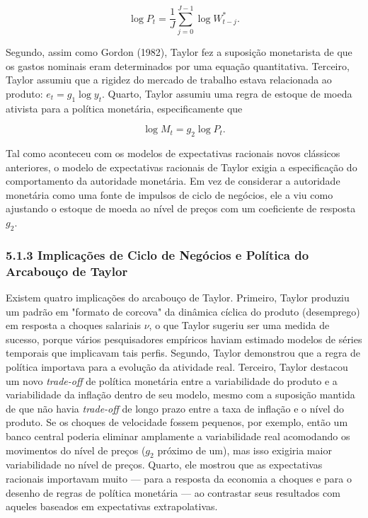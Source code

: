 \documentclass[12pt]{article}
\begin{document}
\begin{equation}
\log P_t = \frac{1}{J} \sum_{j=0}^{J-1} \log W_{t-j}^*. \tag{5.3}
\end{equation}

Segundo, assim como Gordon (1982), Taylor fez a suposição monetarista de que os gastos nominais eram determinados por uma equação quantitativa. Terceiro, Taylor assumiu que a rigidez do mercado de trabalho estava relacionada ao produto: $e_t = g_1 \log y_t$. Quarto, Taylor assumiu uma regra de estoque de moeda ativista para a política monetária, especificamente que

\begin{equation}
\log M_t = g_2 \log P_t. \tag{5.4}
\end{equation}

Tal como aconteceu com os modelos de expectativas racionais novos clássicos anteriores, o modelo de expectativas racionais de Taylor exigia a especificação do comportamento da autoridade monetária. Em vez de considerar a autoridade monetária como uma fonte de impulsos de ciclo de negócios, ele a viu como ajustando o estoque de moeda ao nível de preços com um coeficiente de resposta $g_2$.

\subsubsection{5.1.3 Implicações de Ciclo de Negócios e Política do Arcabouço de Taylor} Existem quatro implicações do arcabouço de Taylor. Primeiro, Taylor produziu um padrão em "formato de corcova" da dinâmica cíclica do produto (desemprego) em resposta a choques salariais $\nu$, o que Taylor sugeriu ser uma medida de sucesso, porque vários pesquisadores empíricos haviam estimado modelos de séries temporais que implicavam tais perfis. Segundo, Taylor demonstrou que a regra de política importava para a evolução da atividade real. Terceiro, Taylor destacou um novo \textit{trade-off} de política monetária entre a variabilidade do produto e a variabilidade da inflação dentro de seu modelo, mesmo com a suposição mantida de que não havia \textit{trade-off} de longo prazo entre a taxa de inflação e o nível do produto. Se os choques de velocidade fossem pequenos, por exemplo, então um banco central poderia eliminar amplamente a variabilidade real acomodando os movimentos do nível de preços ($g_2$ próximo de um), mas isso exigiria maior variabilidade no nível de preços. Quarto, ele mostrou que as expectativas racionais importavam muito — para a resposta da economia a choques e para o desenho de regras de política monetária — ao contrastar seus resultados com aqueles baseados em expectativas extrapolativas.
\end{document}
